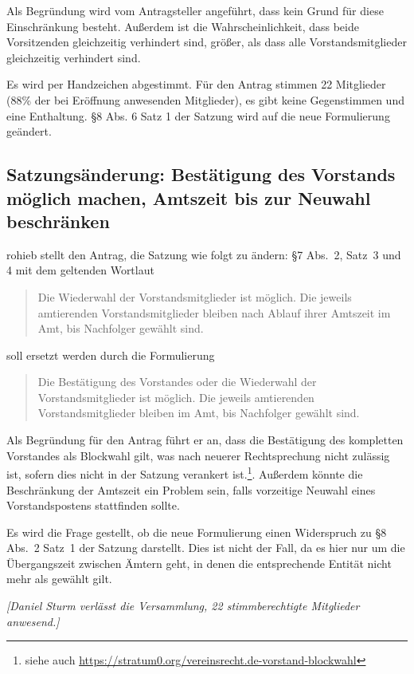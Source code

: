 \documentclass[a4paper,12pt]{scrartcl}
\begin{document}
Als Begründung wird vom Antragsteller angeführt, dass kein Grund für diese
Einschränkung besteht. Außerdem ist die Wahrscheinlichkeit, dass beide
Vorsitzenden gleichzeitig verhindert sind, größer, als dass alle
Vorstandsmitglieder gleichzeitig verhindert sind.

Es wird per Handzeichen abgestimmt. Für den Antrag stimmen 22 Mitglieder (88\%
der bei Eröffnung anwesenden Mitglieder), es gibt keine Gegenstimmen und eine
Enthaltung. §8 Abs. 6 Satz 1 der Satzung wird auf die neue Formulierung
geändert.

\subsection{Satzungsänderung: Bestätigung des Vorstands möglich machen, Amtszeit
bis zur Neuwahl beschränken}

rohieb stellt den Antrag, die Satzung wie folgt zu ändern: §7 Abs.~2, Satz~3 und
4 mit dem geltenden Wortlaut
\begin{quote}
  Die Wiederwahl der Vorstandsmitglieder ist möglich. Die jeweils amtierenden
  Vorstandsmitglieder bleiben nach Ablauf ihrer Amtszeit im Amt, bis Nachfolger
  gewählt sind.
\end{quote}
soll ersetzt werden durch die Formulierung
\begin{quote}
  Die Bestätigung des Vorstandes oder die Wiederwahl der Vorstandsmitglieder ist
  möglich. Die jeweils amtierenden Vorstandsmitglieder bleiben im Amt, bis
  Nachfolger gewählt sind.
\end{quote}

Als Begründung für den Antrag führt er an, dass die Bestätigung des kompletten
Vorstandes als Blockwahl gilt, was nach neuerer Rechtsprechung nicht zulässig
ist, sofern dies nicht in der Satzung verankert ist.\footnote{siehe auch 
\url{https://stratum0.org/vereinsrecht.de-vorstand-blockwahl}}.
Außerdem könnte die Beschränkung der Amtszeit ein Problem sein, falls vorzeitige
Neuwahl eines Vorstandspostens stattfinden sollte.

Es wird die Frage gestellt, ob die neue Formulierung einen Widerspruch zu §8
Abs.~2 Satz~1 der Satzung darstellt. Dies ist nicht der Fall, da es hier nur um
die Übergangszeit zwischen Ämtern geht, in denen die entsprechende Entität nicht
mehr als gewählt gilt.

\emph{[Daniel Sturm verlässt die Versammlung, 22 stimmberechtigte Mitglieder
anwesend.]}
\end{document}
